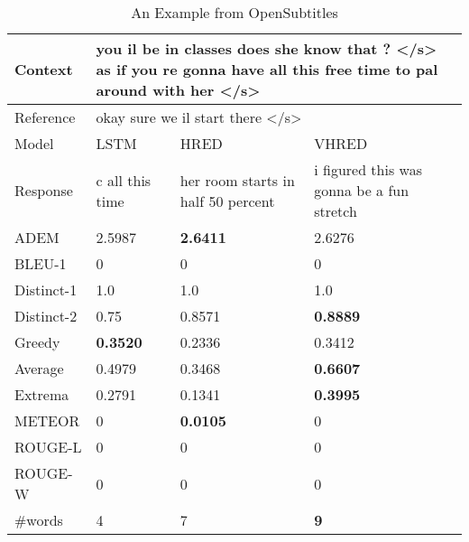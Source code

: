 \begin{table}[htb]
    \caption{An Example from OpenSubtitles}
    \label{tab:Example_OpenSubtitles}
    \centering
    \begin{tabular}{|l|*{3}{p{}|}}
        \hline
        Context & \multicolumn{3}{p{0.64\textwidth}|}{you il be in classes does she know that ? </s> as if you re gonna have all this free time to pal around with her </s>} \\
        \hline
        Reference & \multicolumn{3}{p{0.64\textwidth}|}{okay sure we il start there </s>} \\
        \hline
        Model & LSTM & HRED & VHRED \\
        \hline
        Response & c all this time & her room starts in half 50 percent & i figured this was gonna be a fun stretch \\
        \hline
        ADEM & 2.5987 & \textbf{2.6411} & 2.6276 \\
        \hline
        BLEU-1 & 0 & 0 & 0 \\
        \hline
        Distinct-1 & 1.0 & 1.0 & 1.0 \\
        \hline
        Distinct-2 & 0.75 & 0.8571 & \textbf{0.8889} \\
        \hline
        Greedy & \textbf{0.3520} & 0.2336 & 0.3412 \\
        \hline
        Average & 0.4979 & 0.3468 & \textbf{0.6607} \\
        \hline
        Extrema & 0.2791 & 0.1341 & \textbf{0.3995} \\
        \hline
        METEOR & 0 & \textbf{0.0105} & 0 \\
        \hline
        ROUGE-L & 0 & 0 & 0 \\
        \hline
        ROUGE-W & 0 & 0 & 0 \\
        \hline
        \#words & 4 & 7 & \textbf{9} \\
        \hline
    \end{tabular}
\end{table}
